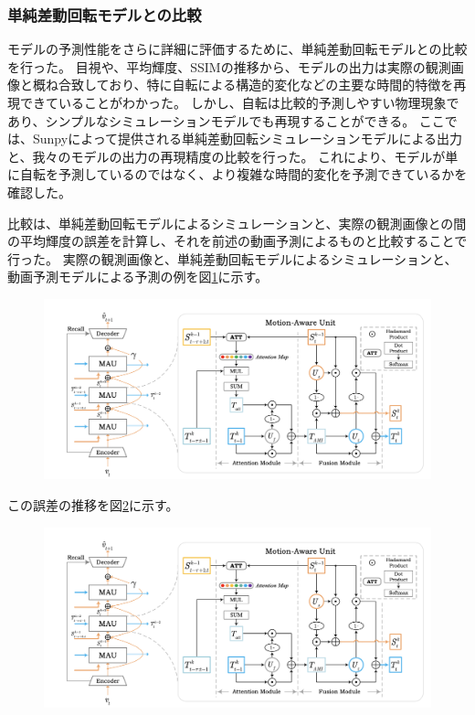       \subsubsection{単純差動回転モデルとの比較}
        モデルの予測性能をさらに詳細に評価するために、単純差動回転モデルとの比較を行った。
        目視や、平均輝度、SSIMの推移から、モデルの出力は実際の観測画像と概ね合致しており、特に自転による構造的変化などの主要な時間的特徴を再現できていることがわかった。
        しかし、自転は比較的予測しやすい物理現象であり、シンプルなシミュレーションモデルでも再現することができる。
        ここでは、Sunpyによって提供される単純差動回転シミュレーションモデルによる出力と、我々のモデルの出力の再現精度の比較を行った。
        これにより、モデルが単に自転を予測しているのではなく、より複雑な時間的変化を予測できているかを確認した。
        
        比較は、単純差動回転モデルによるシミュレーションと、実際の観測画像との間の平均輝度の誤差を計算し、それを前述の動画予測によるものと比較することで行った。
        実際の観測画像と、単純差動回転モデルによるシミュレーションと、動画予測モデルによる予測の例を図\ref{fig:exp1_sdr_example}に示す。
        \begin{figure}[h]
          \centering
          \includegraphics[width=150mm]{figures/mau.png}
          \caption{}
          \label{fig:exp1_sdr_example}
        \end{figure}

        この誤差の推移を図\ref{fig:exp1_sdr_line}に示す。
        \begin{figure}[h]
          \centering
          \includegraphics[width=150mm]{figures/mau.png}
          \caption{}
          \label{fig:exp1_sdr_line}
        \end{figure}
        
